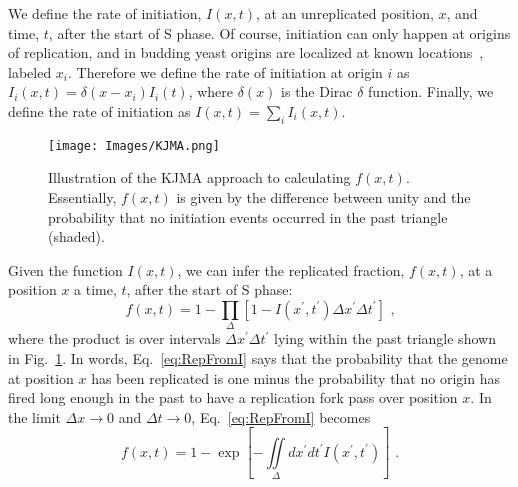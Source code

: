 		We define the rate of initiation, $I(x,t)$, at an unreplicated position, $x$, and time, $t$, after the start of S phase.
		Of course, initiation can only happen at origins of replication, and in budding yeast origins are localized at known locations~\cite{OriDB}, labeled $x_i$.
		Therefore we define the rate of initiation at origin $i$ as $I_i(x,t)=\delta(x-x_i)I_i(t)$, where $\delta(x)$ is the Dirac $\delta$ function.
		Finally, we define the rate of initiation as $I(x,t) = \sum\limits_i I_i(x,t)$.
		
		\begin{figure}[tbh]
			\begin{center}
				\texttt{[image: Images/KJMA.png]}
			\end{center}
				\caption[Replicated fraction from KJMA]{\label{fig:KJMA} Illustration of the KJMA approach to calculating $f(x,t)$.
					Essentially, $f(x,t)$ is given by the difference between unity and the probability that no initiation events occurred in the past triangle (shaded).
				}
		\end{figure}
		
		Given the function $I(x,t)$, we can infer the replicated fraction, $f(x,t)$, at a position $x$ a time, $t$, after the start of S phase:
		\begin{equation} \label{eq:RepFromI}
			f\left( x,t\right) = 1 - \prod_\Delta\left[1-I\left( x^\prime,t^\prime\right)\Delta x^\prime\Delta t^\prime\right] \text{ ,}
		\end{equation}
		where the product is over intervals $\Delta x^\prime \Delta t^\prime$ lying within the past triangle shown in Fig.~\ref{fig:KJMA}.
		In words, Eq.~\ref{eq:RepFromI} says that the probability that the genome at position $x$ has been replicated is one minus the probability that no origin has fired long enough in the past to have a replication fork pass over position $x$.
		In the limit $\Delta x\rightarrow0$ and $\Delta t\rightarrow0$, Eq.~\ref{eq:RepFromI} becomes
		\begin{equation} \label{eq:RepFromIexp}
			f\left( x,t\right) = 1 - \exp\left[-\iint\limits_\Delta dx^\prime dt^\prime I\left( x^\prime,t^\prime\right)\right] \text{ .}
		\end{equation}
		
